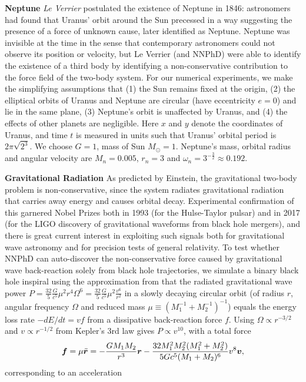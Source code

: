 \documentclass[aps,pre,reprint,superscriptaddress,nofootinbib,amsmath,amssymb]{revtex4-2}
\newcommand{\rvec}{\boldsymbol{r}}
\newcommand{\fvec}{\boldsymbol{f}}
\newcommand{\vvec}{\boldsymbol{v}}
\def\beq#1{\begin{equation}\label{#1}}
\def\eeq{\end{equation}}
\begin{document}
{\bf Neptune} \textit{Le Verrier} postulated the existence of Neptune in 1846: astronomers had found that Uranus' orbit around the Sun precessed in a way suggesting the presence of a force of unknown cause, later identified as Neptune.
Neptune was invisible at the time in the sense that contemporary astronomers could not observe its position or velocity, but Le Verrier (and NNPhD) were able to identify the existence of a third body by identifying a non-conservative contribution to the force field of the two-body system. 
For our numerical experiments, we make the simplifying assumptions that (1) the Sun remains fixed at the origin, (2) the elliptical orbits of Uranus and Neptune are circular (have  eccentricity $e=0$) and lie in the same plane, (3) Neptune's orbit is unaffected by Uranus, and (4) the effects of other planets are negligible. Here $x$ and $y$ denote the coordinates of Uranus, and time $t$ is measured in units such that Uranus' orbital period is $2\pi\sqrt{2^3}$. We choose $G=1$, mass of Sun $M_{\odot}=1$. Neptune's mass, orbital radius and angular velocity are $M_n=0.005$, $r_n=3$ and $\omega_n=3^{-\frac{3}{2}}\approx 0.192$.

{\bf Gravitational Radiation} 
As predicted by Einstein, the gravitational two-body problem is non-conservative, since the system radiates gravitational radiation that carries away energy and causes orbital decay. Experimental confirmation of this garnered Nobel Prizes both in 1993 (for the Hulse-Taylor pulsar) and in 2017 (for the LIGO discovery of gravitational waveforms from black hole mergers), and there is great current interest in exploiting such signals both for gravitational wave astronomy and for precision tests of general relativity.
To test whether NNPhD can auto-discover the non-conservative force caused by gravitational wave back-reaction solely from black hole trajectories, we simulate a binary black hole inspiral
using the approximation from \cite{ligo2017basic} that the 
radiated gravitational wave power 
$P
=\frac{32}{5}\frac{G}{c^5}\mu^2r^4\Omega^6%
=\frac{32}{5}\frac{G}{c^5}\mu^2\frac{v^6}{r^2}$ in a slowly decaying circular orbit (of radius $r$, angular frequency $\Omega$ and reduced mass $\mu\equiv (M_1^{-1}+M_2^{-1})^{-1}$)
equals the energy loss rate $-dE/dt=v f$ %
from a dissipative back-reaction force $f$.
Using $\Omega\propto r^{-3/2}$ and $v\propto r^{-1/2}$ from Kepler's 3rd law gives  $P\propto v^{10}$, with a total force
\beq{InspiralEq}
\fvec = \mu\ddot{\rvec} = -{GM_1M_2\over r^3}\rvec -\frac{32M_1^2M_2^2(M_1^2+M_2^2)}{5Gc^5(M_1+M_2)^6} v^8\vvec,
\eeq
corresponding to an acceleration
\end{document}
